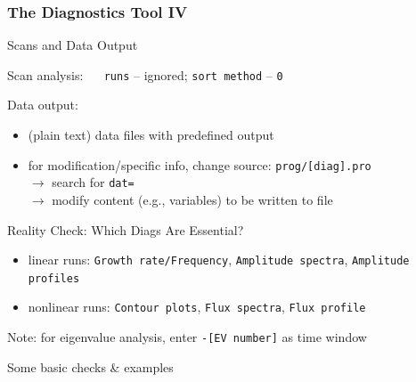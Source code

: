 \documentclass[9pt]{beamer}
\begin{document}

\begin{frame}[fragile]
  \frametitle{The Diagnostics Tool IV}

\begin{block}{Scans and Data Output}

Scan analysis: $\quad$ \verb|runs| -- ignored; \verb|sort method| -- \verb|0|

Data output:
\begin{itemize}
\item (plain text) data files with predefined output
\item for modification/specific info, change source: \verb|prog/[diag].pro|\\
$\rightarrow$ search for \verb|dat=|\\
$\rightarrow$ modify content (e.g., variables) to be written to file
\end{itemize}
\end{block}

\begin{block}{Reality Check: Which Diags Are Essential?}
\begin{itemize}
\item linear runs: \verb|Growth rate/Frequency|, \verb|Amplitude spectra|, \verb|Amplitude profiles|
\item nonlinear runs: \verb|Contour plots|, \verb|Flux spectra|, \verb|Flux profile|
\end{itemize}
\end{block}

Note: for eigenvalue analysis, enter \verb|-[EV number]| as time window

\end{frame}


\begin{frame}[plain]

\begin{center}

\begin{exampleblock}

\begin{center}
\LARGE
Some basic checks \& examples%
\end{center}
\end{exampleblock}

\end{center}
\end{frame}
\end{document}
